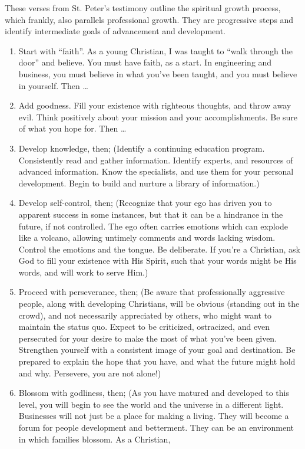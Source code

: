 \documentclass[12pt]{memoir}
\begin{document}
These verses from St. Peter's testimony outline the spiritual growth
process, which frankly, also parallels professional growth. They are
progressive steps and identify intermediate goals of advancement and
development.
\begin{enumerate}
\item Start with ``faith''. As a young Christian, I was taught to ``walk
through the door'' and believe. You must have faith, as a start.
In engineering and business, you must believe in what you've been
taught, and you must believe in yourself. Then \dots
\item Add goodness. Fill your existence with righteous thoughts, and throw
away evil. Think positively about your mission and your accomplishments.
Be sure of what you hope for. Then \dots 
\item Develop knowledge, then; (Identify a continuing education program.
Consistently read and gather information. Identify experts, and resources
of advanced information. Know the specialists, and use them for your
personal development. Begin to build and nurture a library of information.) 
\item Develop self-control, then; (Recognize that your ego has driven you
to apparent success in some instances, but that it can be a hindrance
in the future, if not controlled. The ego often carries emotions which
can explode like a volcano, allowing untimely comments and words lacking
wisdom. Control the emotions and the tongue. Be deliberate. If you're
a Christian, ask God to fill your existence with His Spirit, such
that your words might be His words, and will work to serve Him.) 
\item Proceed with perseverance, then; (Be aware that professionally aggressive
people, along with developing Christians, will be obvious (standing
out in the crowd), and not necessarily appreciated by others, who
might want to maintain the status quo. Expect to be criticized, ostracized,
and even persecuted for your desire to make the most of what you've
been given. Strengthen yourself with a consistent image of your goal
and destination. Be prepared to explain the hope that you have, and
what the future might hold and why. Persevere, you are not alone!) 
\item Blossom with godliness, then; (As you have matured and developed to
this level, you will begin to see the world and the universe in a
different light. Businesses will not just be a place for making a
living. They will become a forum for people development and betterment.
They can be an environment in which families blossom. As a Christian,

\end{enumerate}
\end{document}
